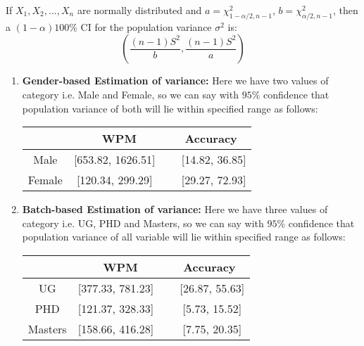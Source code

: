 \documentclass[12pt,a4paper]{report}
\begin{document}
\begin{enumerate}[label=\textbf{\arabic*})]
    If $X_1, X_2,..., X_n$ are normally distributed and $a = \chi^2_{1-\alpha/2,n-1}$, $b = \chi^2_{\alpha/2,n-1}$, then a $(1 - \alpha)100\%$ CI for the population variance $\sigma^2$ is:
    \[ \left(\dfrac{(n-1)S^2}{b}, \dfrac{(n-1)S^2}{a}\right)
    \]
    \begin{enumerate}
        \item \textbf{Gender-based Estimation of variance:}
        Here we have two values of category i.e. Male and Female, so we can say with $95\%$ confidence that population variance of both will lie within specified range as follows:
    \begin{center}
    \begin{tabular}{ |c|c|c|}
      \hline
       & WPM & Accuracy \\
      \hline
      Male & [653.82, 1626.51] \ & \ [14.82, 36.85] \\ 
      \hline
      Female & [120.34, 299.29] \ & \ [29.27, 72.93] \\
      \hline
    \end{tabular}
    \end{center}
    \vspace{2mm}
        
        \item \textbf{Batch-based Estimation of variance:}
        Here we have three values of category i.e. UG, PHD and Masters, so we can say with $95\%$ confidence that population variance of all variable will lie within specified range as follows:
    \begin{center}
    \begin{tabular}{ |c|c|c|}
      \hline
       & WPM & Accuracy \\
      \hline
      UG & [377.33, 781.23] \ & \ [26.87, 55.63] \\ 
      \hline
      PHD & [121.37, 328.33] \ & \ [5.73, 15.52] \\
      \hline
      Masters & [158.66, 416.28] \ & \ [7.75, 20.35] \\
      \hline
    \end{tabular}
    \end{center}
    \vspace{2mm}
    

\end{enumerate}
\end{enumerate}
\end{document}
